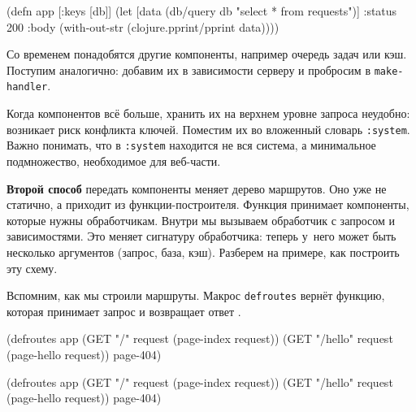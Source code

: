 \else

\begin{english}
  \begin{clojure}
(defn app [{:keys [db]}]
  (let [data (db/query db "select * from requests")]
    {:status 200
     :body (with-out-str
             (clojure.pprint/pprint data))}))
  \end{clojure}
\end{english}

\fi

Со временем понадобятся другие компоненты, например очередь задач или
кэш. Поступим аналогично: добавим их в зависимости серверу и пробросим в
\verb|make-handler|.


Когда компонентов всё больше, хранить их на верхнем уровне запроса неудобно:
возникает риск конфликта ключей. Поместим их во вложенный словарь
\verb|:system|. Важно понимать, что в \verb|:system| находится не вся система, а
минимальное подмножество, необходимое для веб-части.

\textbf{Второй способ} передать компоненты меняет дерево маршрутов. Оно уже не
статично, а приходит из функции-построителя. Функция принимает компоненты,
которые нужны обработчикам. Внутри мы вызываем обработчик с запросом и
зависимостями. Это меняет сигнатуру обработчика: теперь у~него может быть
несколько аргументов (запрос, база, кэш). Разберем на примере, как построить эту
схему.


Вспомним, как мы строили маршруты. Макрос \verb|defroutes| вернёт функцию,
которая принимает запрос и возвращает ответ .

\ifnarrow

\begin{english}
  \begin{clojure}
(defroutes app
  (GET "/"
    request (page-index request))
  (GET "/hello"
    request (page-hello request))
  page-404)
  \end{clojure}
\end{english}

\else

\begin{english}
  \begin{clojure}
(defroutes app
  (GET "/"      request (page-index request))
  (GET "/hello" request (page-hello request))
  page-404)
  \end{clojure}
\end{english}

